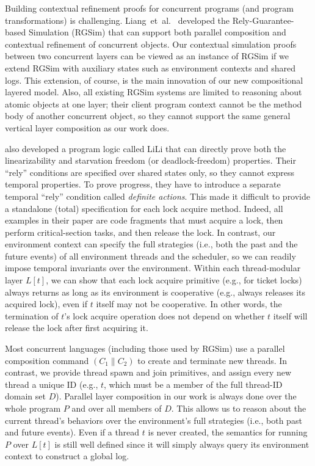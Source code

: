  Building contextual refinement proofs
for concurrent programs (and program transformations) is challenging.
Liang~{et~al.}~\cite{RGSim,Liang14lics,lili16} developed the
Rely-Guarantee-based Simulation (RGSim) that can support both parallel
composition and  contextual refinement of concurrent
objects. Our contextual simulation proofs between two concurrent
layers can be viewed as an instance of RGSim if we extend RGSim with
auxiliary states such as environment contexts and shared logs. This
extension, of course, is the main innovation of our new compositional
layered model. Also, all existing RGSim systems are limited to reasoning
about atomic objects at one layer; their client program context cannot
be the method body of another concurrent object, so they cannot
support the same general vertical layer composition as our work does.

\citet{lili16} also developed a program logic called LiLi that can
directly prove both the linearizability and starvation freedom (or
deadlock-freedom) properties. Their ``rely'' conditions are specified
over shared states only, so they cannot express temporal properties. To
prove progress, they have to introduce a separate temporal ``rely''
condition called {\em definite actions}.  This made it difficult to
provide a standalone (total) specification for each lock acquire
method.  Indeed, all examples in their paper are code fragments that
must acquire a lock, then perform critical-section tasks, and then release the
lock. In contrast, our environment context can specify the full
strategies (i.e., both the past and the future events) of all
environment threads and the scheduler, so we can readily impose
temporal invariants over the environment. Within each thread-modular
layer $L[t]$, we can show that each lock acquire primitive (e.g., for
ticket locks) always returns as long as its environment is cooperative
(e.g., always releases its acquired lock), even if $t$ itself may not
be cooperative.
In other words, the termination of $t$'s lock acquire
operation does not depend on whether $t$ itself will release the lock
after first acquiring it.

Most concurrent languages (including those used by RGSim) use a
parallel composition command $(C_1 \| C_2)$ to create and terminate
new threads.  In contrast, we provide thread spawn and join
primitives, and assign every new thread a unique ID (e.g., $t$, which
must be a member of the full thread-ID domain set $D$). Parallel layer
composition in our work is always done over the whole program $P$ and over
all members of $D$. This allows us to reason about the current
thread's behaviors over the environment's full strategies (i.e., both
past and future events). Even if a thread $t$ is never
created, the semantics for running $P$ over $L[t]$ is still well
defined since it will simply always query its environment context to
construct a global log.

